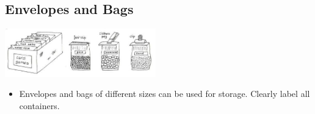 \begin{multicols}{2}
\section{Envelopes and Bags}

\begin{center}
\includegraphics[width=0.49\textwidth]{./img/vso/envelopes-bags.jpg}
\end{center}

\begin{itemize}
\item Envelopes and bags of different
sizes can be used for storage.
Clearly label all containers.
\end{itemize}


%
%

\end{multicols}

%
%


